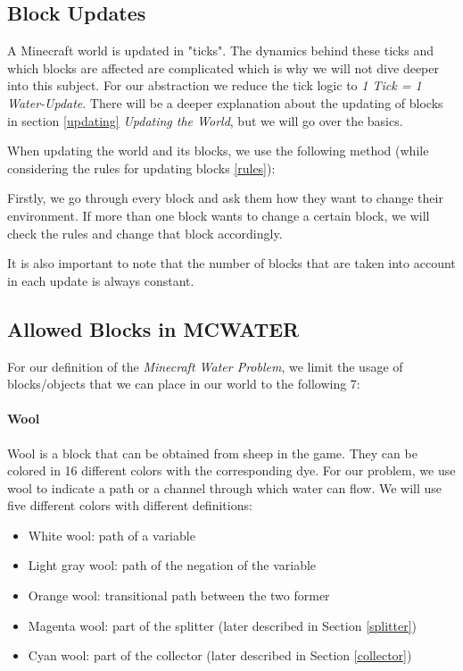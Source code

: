 \subsection{Block Updates} \label{blockupdates}
\noindent A Minecraft world is updated in "ticks". The dynamics behind these ticks and which blocks are affected are complicated which is why we will not dive deeper into this subject. For our abstraction we reduce the tick logic to \textit{1 Tick = 1 Water-Update}. There will be a deeper explanation about the updating of blocks in section \ref{updating} \textit{Updating the World}, but we will go over the basics.

\noindent When updating the world and its blocks, we use the following method (while considering the rules for updating blocks \ref{rules}):

\noindent Firstly, we go through every block and ask them how they want to change their environment. If more than one block wants to change a certain block, we will check the rules and change that block accordingly. 

\noindent It is also important to note that the number of blocks that are taken into account in each update is always constant.

\pagebreak
\subsection{Allowed Blocks in MCWATER} \label{blocks}

\noindent For our definition of the \textit{Minecraft Water Problem}, we limit the usage of blocks/objects that we can place in our world to the following 7:
\paragraph{Wool\cite{minecraftfandom:wool}}
Wool is a block that can be obtained from sheep in the game.
They can be colored in 16 different colors with the corresponding dye.
For our problem, we use wool to indicate a path or a channel through which water can flow.
We will use five different colors with different definitions:
\begin{itemize}
    \item White wool: path of a variable
    \item Light gray wool: path of the negation of the variable
    \item Orange wool: transitional path between the two former
    \item Magenta wool: part of the splitter (later described in Section \ref{splitter})
    \item Cyan wool: part of the collector (later described in Section \ref{collector})
\end{itemize}

